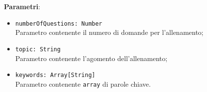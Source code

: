 \begin{itemize}
\begin{itemize}
		\textbf{Parametri}:
		\begin{itemize}
			\item \texttt{numberOfQuestions: Number} \\
			Parametro contenente il numero di domande per l'allenamento;
			\item \texttt{topic: String} \\
			Parametro contenente l'agomento dell'allenamento;
			\item \texttt{keywords: Array[String]} \\
			Parametro contenente \texttt{array} di parole chiave.
		\end{itemize}
	\end{itemize}
\end{itemize}

